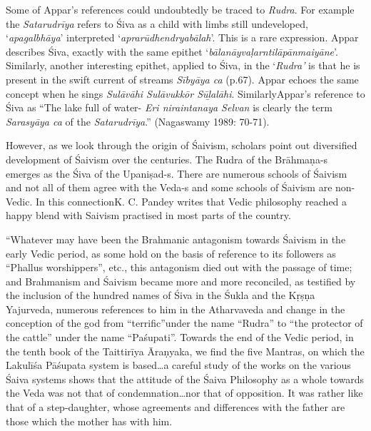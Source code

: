 \begin{myquote}
Some of Appar’s references could undoubtedly be traced to \textit{Rudra}. For example the \textit{Satarudrīya} refers to Śiva as a child with limbs still undeveloped, ‘\textit{apagalbhāya}’ interpreted ‘\textit{aprarūdhendryabālah}’. This is a rare expression. Appar describes Śiva, exactly with the same epithet ‘\textit{bālanāyvaḷarntilāpānmaiyāne}’. Similarly, another interesting epithet, applied to Śiva, in the ‘\textit{Rudra’} is that he is present in the swift current of streams \textit{Sībyāya ca} (p.67). Appar echoes the same concept when he sings \textit{Sulāvāhi Sulāvukkōr Sūḻalāhi}. SimilarlyAppar’s reference to Śiva as “The lake full of water- \textit{Eri niraintanaya Selvan} is clearly the term \textit{Sarasyāya ca} of the \textit{Satarudrīya}.” (Nagaswamy 1989: 70-71).
\end{myquote}

However, as we look through the origin of Śaivism, scholars point out diversified development of Śaivism over the centuries. The Rudra of the Brāhmaṇa-s emerges as the Śiva of the Upaniṣad-s. There are numerous schools of Śaivism and not all of them agree with the Veda-s and some schools of Śaivism are non-Vedic. In this connection\break K. C. Pandey writes that Vedic philosophy reached a happy blend with Saivism practised in most parts of the country.

\begin{myquote}
“Whatever may have been the Brahmanic antagonism towards Śaivism in the early Vedic period, as some hold on the basis of reference to its followers as “Phallus worshippers”, etc., this antagonism died out with the passage of time; and Brahmanism and Śaivism became more and more reconciled, as testified by the inclusion of the hundred names of Śiva in the Śukla and the Kṛṣṇa Yajurveda, numerous references to him in the Atharvaveda and change in the conception of the god from “terrific”under the name “Rudra” to “the protector of the cattle” under the name “Paśupati”. Towards the end of the Vedic period, in the tenth book of the Taittirīya Āraṇyaka, we find the five Mantras, on which the Lakulīśa Pāśupata system is based…a careful study of the works on the various Śaiva systems shows that the attitude of the Śaiva Philosophy as a whole towards the Veda was not that of condemnation…nor that of opposition. It was rather like that of a step-daughter, whose agreements and differences with the father are those which the mother has with him.
\end{myquote}

